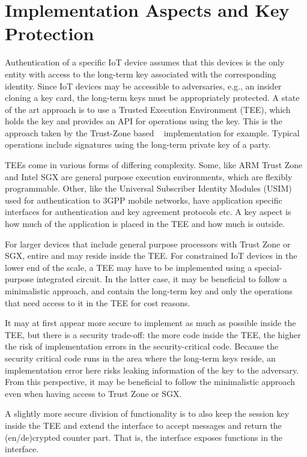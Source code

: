 \section{Implementation Aspects and Key Protection}
\label{sec:TEE}
Authentication of a specific IoT device assumes that this devices is the only
entity with access to the long-term key associated with the corresponding
identity.
%
Since IoT devices may be accessible to adversaries, e.g., an insider cloning a
key card, the long-term keys must be appropriately protected.
%
A state of the art approach is to use a Trusted Execution Environment (TEE),
which holds the key and provides an API for operations using the key.
%
This is the approach taken by the
Trust-Zone based \mMuEdhoc{}~\cite{DBLP:conf/codaspy/Hristozov0XFLS21}
implementation for example.
%
Typical operations include signatures using the long-term private key of a
party.
%

TEEs come in various forms of differing complexity.
%
Some, like ARM Trust Zone and Intel SGX are general purpose execution
environments, which are flexibly programmable.
%
Other, like the Universal Subscriber Identity Modules (USIM) used for
authentication to 3GPP mobile networks, have application specific interfaces for
authentication and key agreement protocols etc.
%
A key aspect is how much of the application is placed in the TEE and how much is
outside.
%

For larger devices that include general purpose processors with Trust Zone or
SGX, entire \mEdhoc{} and \mOscore{} may reside inside the TEE.
%
For constrained IoT devices in the lower end of the scale, a TEE may have to be
implemented using a special-purpose integrated circuit.
%
In the latter case, it may be beneficial to follow a minimalistic approach, and
contain the long-term key and only
the operations that need access to it in the TEE for cost reasons.
%

It may at first appear more secure to implement as much as possible inside the
TEE, but there is a security trade-off: the more code inside the TEE,
the higher the risk of implementation errors in the security-critical code.
%
Because the security critical code runs in the area where the long-term keys
reside, an implementation error here risks leaking information of the key to the
adversary.
%
From this perspective, it may be beneficial to follow the minimalistic approach
even when having access to Trust Zone or SGX.
%

A slightly more secure division of functionality is to also keep the
session key inside
the TEE and extend the interface to accept messages and return the
(en/de)crypted counter part.
%
That is, the interface exposes \mAead{} functions in the interface.
%

